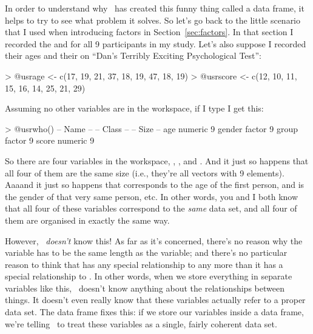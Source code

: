 In order to understand why \R\ has created this funny thing called a data frame, it helps to try to see what problem it solves. So let's go back to the little scenario that I used when introducing factors in Section~\ref{sec:factors}. In that section I recorded the  and  for all 9 participants in my study. Let's also suppose I recorded their ages and their  on ``Dan's Terribly Exciting Psychological Test'':
\begin{rblock1}
> @usr{age <- c(17, 19, 21, 37, 18, 19, 47, 18, 19)}
> @usr{score <- c(12, 10, 11, 15, 16, 14, 25, 21, 29)}
\end{rblock1}
Assuming no other variables are in the workspace, if I type  I get this:
\begin{rblock1}
> @usr{who()}
   -- Name --   -- Class --   -- Size --
   age          numeric       9         
   gender       factor        9         
   group        factor        9         
   score        numeric       9          
\end{rblock1}
So there are four variables in the workspace, , ,  and . And it just so happens that all four of them are the same size (i.e., they're all vectors with 9 elements). Aaaand it just so happens that  corresponds to the age of the first person, and  is the gender of that very same person, etc. In other words, you and I both know that all four of these variables correspond to the {\it same} data set, and all four of them are organised in exactly the same way. 

However, \R\ {\it doesn't} know this! As far as it's concerned, there's no reason why the  variable has to be the same length as the  variable; and there's no particular reason to think that  has any special relationship to  any more than it has a special relationship to . In other words, when we store everything in separate variables like this, \R\ doesn't know anything about the relationships between things. It doesn't even really know that these variables actually refer to a proper data set. The data frame fixes this: if we store our variables inside a data frame, we're telling \R\ to treat these variables as a single, fairly coherent data set. 

